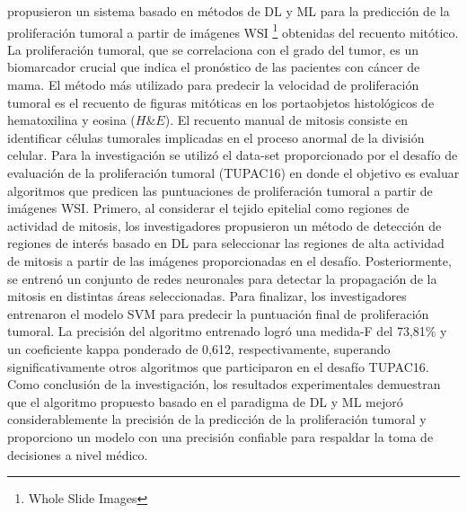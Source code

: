 \cite{Nateghi2021} propusieron un sistema basado en métodos de DL y ML para la predicción de la proliferación tumoral a partir de imágenes WSI \footnote{ Whole Slide Images } obtenidas del recuento mitótico. La proliferación tumoral, que se correlaciona con el grado del tumor, es un biomarcador crucial que indica el pronóstico de las pacientes con cáncer de mama. El método más utilizado para predecir la velocidad de proliferación tumoral es el recuento de figuras mitóticas en los portaobjetos histológicos de hematoxilina y eosina ($H\&E$). El recuento manual de mitosis consiste en identificar células tumorales implicadas en el proceso anormal de la división celular. Para la investigación se utilizó el data-set proporcionado por el desafío de evaluación de la proliferación tumoral (TUPAC16) en donde el objetivo es evaluar algoritmos que predicen las puntuaciones de proliferación tumoral a partir de imágenes WSI. Primero, al considerar el tejido epitelial como regiones de actividad de mitosis, los investigadores propusieron un método de detección de regiones de interés basado en DL para seleccionar las regiones de alta actividad de mitosis a partir de las imágenes proporcionadas en el desafío. Posteriormente, se entrenó un conjunto de redes neuronales para detectar la propagación de la mitosis en distintas áreas seleccionadas. Para finalizar, los investigadores entrenaron el modelo SVM para predecir la puntuación final de proliferación tumoral. La precisión del algoritmo entrenado logró una medida-F del 73,81\% y un coeficiente kappa ponderado de 0,612, respectivamente, superando significativamente otros algoritmos que participaron en el desafío TUPAC16. Como conclusión de la investigación, los resultados experimentales demuestran que el algoritmo propuesto basado en el paradigma de DL y ML mejoró considerablemente la precisión de la predicción de la proliferación tumoral y proporciono un modelo con una precisión confiable para respaldar la toma de decisiones a nivel médico.

